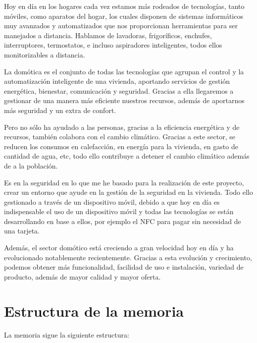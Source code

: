 
Hoy en día en los hogares cada vez estamos más rodeados de tecnologías, tanto móviles, como aparatos del hogar, los cuales disponen de sistemas informáticos muy avanzados y automatizados que nos proporcionan herramientas para ser manejados a distancia. Hablamos de lavadoras, frigoríficos, enchufes, interruptores, termostatos, e incluso aspiradores inteligentes, todos ellos monitorizables a distancia.

La domótica es el conjunto de todas las tecnologías que agrupan el control y la automatización inteligente de una vivienda, aportando servicios de gestión energética, bienestar, comunicación y seguridad. Gracias a ella llegaremos a gestionar de una manera más eficiente nuestros recursos, además de aportarnos más seguridad y un extra de confort.

Pero no sólo ha ayudado a las personas, gracias a la eficiencia energética y de recursos, también colabora con el cambio climático. Gracias a este sector, se reducen los consumos en calefacción, en energía para la vivienda, en gasto de cantidad de agua, etc, todo ello contribuye a detener el cambio climático además de a la población.

Es en la seguridad en lo que me he basado para la realización de este proyecto, crear un entorno que ayude en la gestión de la seguridad en la vivienda. Todo ello gestionado a través de un dispositivo móvil, debido a que hoy en día es indispensable el uso de un dispositivo móvil y todas las tecnologías se están desarrollando en base a ellos, por ejemplo el NFC para pagar sin necesidad de una tarjeta.

Además, el sector domótico está creciendo a gran velocidad hoy en día y ha evolucionado notablemente recientemente. Gracias a esta evolución y crecimiento, podemos obtener más funcionalidad, facilidad de uso e instalación, variedad de producto, además de mayor calidad y mayor oferta.



\section{Estructura de la memoria}

La memoria sigue la siguiente estructura:

